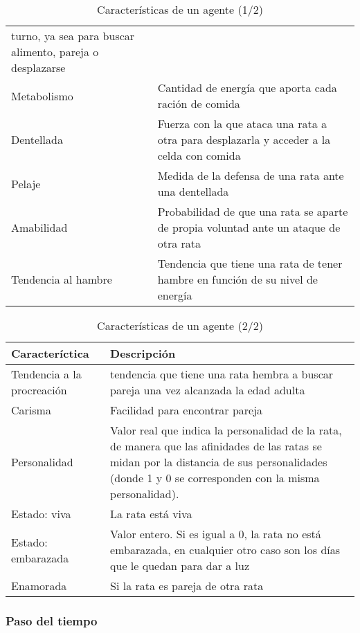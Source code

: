 \begin{table}[h]
\begin{tabular}{| p{3cm} | p{10cm} |}
turno, ya sea para buscar alimento, pareja o desplazarse  \\
Metabolismo & Cantidad de energía que aporta cada ración de comida \\
Dentellada & Fuerza con la que ataca una rata a otra para desplazarla y acceder
a la celda con comida \\
Pelaje & Medida de la defensa de una rata ante una dentellada \\
Amabilidad & Probabilidad de que una rata se aparte de propia voluntad ante un
ataque de otra rata \\
Tendencia al hambre & Tendencia que tiene una rata de tener hambre en función
de su nivel de energía\\
\hline %
\end{tabular}
\label{tab:caracteristicas}
\caption{Características de un agente (1/2)} %
\end{table}


\begin{table}[h]
\centering %
\begin{tabular}{| p{3cm} | p{10cm} |} %
\hline\hline
Caracteríctica & Descripción\\
\hline %
Tendencia a la procreación & tendencia que tiene una rata hembra a buscar
pareja una vez alcanzada la edad adulta \\
Carisma & Facilidad para encontrar pareja \\
Personalidad & Valor real que indica la personalidad de la rata, de manera que
las afinidades de las ratas se midan por la distancia de sus personalidades
(donde 1 y 0 se corresponden con la misma personalidad). \\
Estado: viva & La rata está viva \\
Estado: embarazada & Valor entero. Si es igual a 0, la rata no está embarazada,
en cualquier otro caso son los días que le quedan para dar a luz \\
Enamorada & Si la rata es pareja de otra rata \\
\hline %
\end{tabular}
\label{tab:caracteristicas}
\caption{Características de un agente (2/2)} %
\end{table}


\subsubsection{Paso del tiempo}


